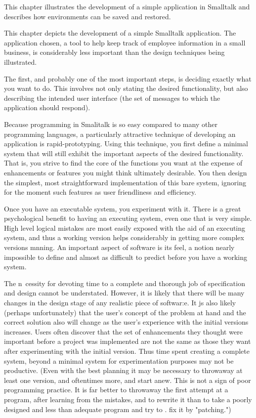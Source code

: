 \secdown

This chapter illustrates the development of a simple application in
Smalltalk and describes how environments can be saved and restored.

\bigskip

This chapter depicts the development of a simple Smalltalk application.
The application chosen, a tool to help keep track of employee information
in a small business, is considerably less important than the design techniques being illustrated.

The first, and probably one of the most important steps, is deciding
exactly what you want to do. This involves not only stating the desired
functionality, but also describing the intended user interface (the set of
messages to which the application should respond).

Because programming in Smalitalk is so easy compared to many other
programming languages, a particularly attractive technique of developing
an application is rapid-prototyping. Using this technique, you first define
a minimal system that will still exhibit the important aspects of the desired
functionality. That is, you strive to find the core of the functions you want
at the expense of enhancements or features you might think ultimately
desirable. You then design the simplest, most straightforward implementation of this bare system, ignoring for the moment such features as user
friendliness and efficiency.

Once you have an executable system, you experiment with it. There is
a great psychological benefit to having an executing system, even one that
is very simple. High level logical mistakes are most easily exposed with
the aid of an executing system, and thus a working version helps considerably in getting more complex versions mnning. An important aspect of
software is its feel, a notion nearly impossible to define and almost as
difficult to predict before you have a working system.

The n~cessity for devoting time to a complete and thorough job of
specification and design cannot be understated. However, it is likely that
there will be many changes in the design stage of any realistic piece of
softwar:e. It js also likely (perhaps unfortunately) that the user's concept
of the problem at hand and the correct solution also will change as the
user's experience with the initial versions increases. Users often discover
that the set of enhancements they thought were important before a project
was implemented are not the same as those they want after experimenting
with the initial version. Thus time spent creating a complete system, beyond a minimal system for experimentation purposes may not be productive. (Even with the best planning it may be necessary to throwaway at
least one version, and oftentimes more, and start anew. This is not a sign
of poor programming practice. It is far better to throwaway the first
attempt at a program, after learning from the mistakes, and to rewrite it
than to take a poorly designed and less than adequate program and try to .
fix it by "patching.")

